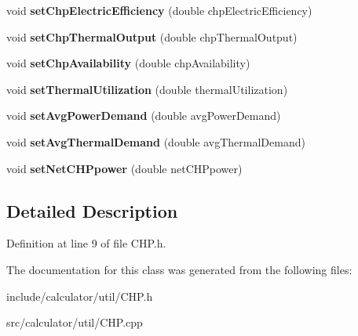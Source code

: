 \begin{DoxyCompactItemize}
\mbox{\label{class_c_h_p_a63de982e8324e669ea8a6712a30a6ce4}} 
void {\bfseries set\+Chp\+Electric\+Efficiency} (double chp\+Electric\+Efficiency)
\item 
\mbox{\label{class_c_h_p_a4b132e4e600df80fa87c0e7b680733b7}} 
void {\bfseries set\+Chp\+Thermal\+Output} (double chp\+Thermal\+Output)
\item 
\mbox{\label{class_c_h_p_a0dc3c1f0e0b67564a56b5863c1abf974}} 
void {\bfseries set\+Chp\+Availability} (double chp\+Availability)
\item 
\mbox{\label{class_c_h_p_a8917dfa8b8a68244d0ffe3fd3ca1d13f}} 
void {\bfseries set\+Thermal\+Utilization} (double thermal\+Utilization)
\item 
\mbox{\label{class_c_h_p_a4f3183df776744f6871fb59b07553d2c}} 
void {\bfseries set\+Avg\+Power\+Demand} (double avg\+Power\+Demand)
\item 
\mbox{\label{class_c_h_p_a0036fd3fc3154adc0fdba0ede8277bee}} 
void {\bfseries set\+Avg\+Thermal\+Demand} (double avg\+Thermal\+Demand)
\item 
\mbox{\label{class_c_h_p_a625efb308ccd22c8bdf75f082ff7bae2}} 
void {\bfseries set\+Net\+C\+H\+Ppower} (double net\+C\+H\+Ppower)
\end{DoxyCompactItemize}


\subsection{Detailed Description}


Definition at line 9 of file C\+H\+P.\+h.



The documentation for this class was generated from the following files\+:\begin{DoxyCompactItemize}
\item 
include/calculator/util/C\+H\+P.\+h\item 
src/calculator/util/C\+H\+P.\+cpp\end{DoxyCompactItemize}
